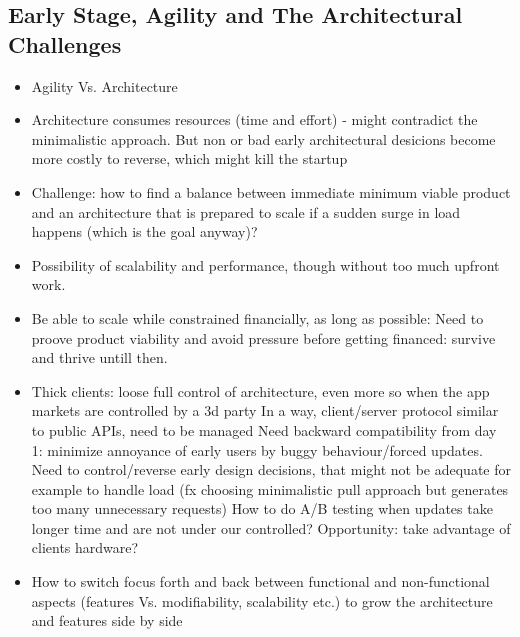 \documentclass[a4paper,10pt]{article}
\begin{document}
\subsection{Early Stage, Agility and The Architectural Challenges}
\begin{itemize}
\item Agility Vs. Architecture
\item Architecture consumes resources (time and effort) - might contradict the minimalistic approach. But non or 
      bad early architectural desicions become more costly to reverse, which might kill the startup
\item Challenge: how to find a balance between immediate minimum viable product and an architecture that is prepared to scale if a sudden surge in load happens (which is the goal anyway)?
\item Possibility of scalability and performance, though without too much upfront work.
\item Be able to scale while constrained financially, as long as possible: Need to proove product viability and avoid pressure before getting financed: survive and thrive untill then.
\item Thick clients: loose full control of architecture, even more so when the app markets are controlled by a 3d party
\subitem In a way, client/server protocol similar to public APIs, need to be managed
\subitem Need backward compatibility from day 1: minimize annoyance of early users by buggy behaviour/forced updates.
\subitem Need to control/reverse early design decisions, that might not be adequate for example to handle load (fx choosing minimalistic pull approach but generates too many unnecessary requests)
\subitem How to do A/B testing when updates take longer time and are not under our controlled?
\subitem Opportunity: take advantage of clients hardware? %

\item How to switch focus forth and back between functional and non-functional aspects (features Vs. modifiability, scalability etc.) 
      to grow the architecture and features side by side 
\end{itemize}
\end{document}
